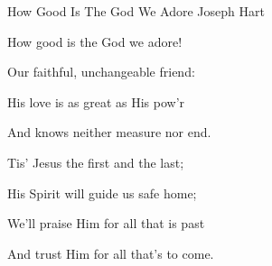 \documentclass[12pt]{book}
\begin{document}
\begin{song}{How Good Is The God We Adore}{}
  {\SBPubDom}
  {Joseph Hart}
  {}
  {}

  \begin{SBVerse}
    How good is the God we adore!

    Our faithful, unchangeable friend:

    His love is as great as His pow'r

    And knows neither measure nor end.
  \end{SBVerse}

  \begin{SBVerse}
    Tis' Jesus the first and the last;

    His Spirit will guide us safe home;

    We'll praise Him for all that is past

    And trust Him for all that's to come.
  \end{SBVerse}
\end{song}
\end{document}
